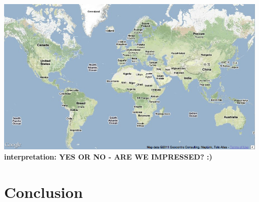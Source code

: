 \documentclass[11pt,a4paper,english]{article}
\begin{document}
\begin{itemize}
						\includegraphics[width=130mm]{img/2005-1}
						\bf interpretation: \rm YES OR NO - ARE WE IMPRESSED? :)
						
					
						
				\end{itemize}
	

	\section{Conclusion}
\end{document}
